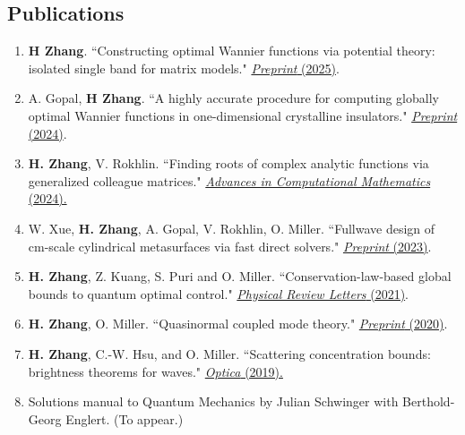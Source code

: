 \documentclass[margin,line,pifont,palatino,courier]{res}
\begin{document}
\begin{resume}
\section{\sc Publications}
\begin{enumerate}
\setlength\itemsep{0em}
	\item{\textbf{H Zhang}. ``Constructing optimal Wannier functions via potential theory: isolated single band for matrix models." \href{https://arxiv.org/abs/2502.08641}{\color{blue} \emph{Preprint} (2025)}.}
	\item{A. Gopal, \textbf{H Zhang}. ``A highly accurate procedure for computing globally optimal Wannier functions in one-dimensional crystalline insulators." \href{https://arxiv.org/abs/2409.04369}{\color{blue} \emph{Preprint} (2024)}.}
	\item \textbf{H. Zhang}, V. Rokhlin. ``Finding roots of complex analytic functions via generalized colleague matrices." \href{https://link.springer.com/article/10.1007/s10444-024-10174-z}{\color{blue}  \emph{Advances in Computational Mathematics} (2024).}
	\item W. Xue, \textbf{H. Zhang}, A. Gopal, V. Rokhlin, O. Miller. ``Fullwave design of cm-scale cylindrical metasurfaces via fast direct solvers." \href{https://arxiv.org/abs/2308.08569}{\color{blue} \emph{Preprint} (2023)}.
	\item{\textbf{H. Zhang}, Z. Kuang, S. Puri and O. Miller. ``Conservation-law-based global bounds to quantum optimal control." \href{https://journals.aps.org/prl/abstract/10.1103/PhysRevLett.127.110506}{\color{blue} \emph{Physical Review Letters} (2021)}.}
	\item{\textbf{H. Zhang}, O. Miller. ``Quasinormal coupled mode theory." \href{https://arxiv.org/abs/2010.08650}{\color{blue} \emph{Preprint} (2020)}.}
	\item{\textbf{H. Zhang}, C.-W. Hsu, and O. Miller. ``Scattering concentration bounds: brightness theorems for waves." \href{https://doi.org/10.1364/OPTICA.6.001321}{\color{blue} \emph{Optica} (2019).}}
	\item{Solutions manual to Quantum Mechanics by Julian Schwinger with Berthold-Georg Englert. (To appear.)}
\end{enumerate}


\end{resume}
\end{document}
